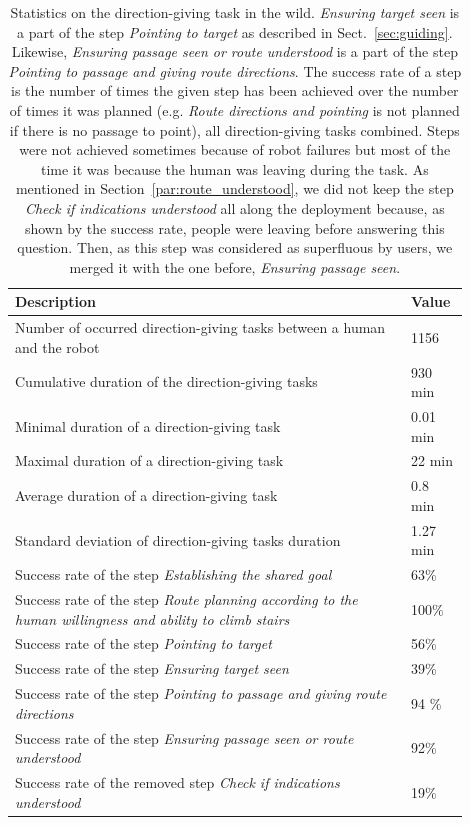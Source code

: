 \documentclass[a4paper,11pt,twoside]{StyleThese}
\begin{document}
\begin{table}[htp]
	\centering
	\begin{tabular}{p{0.8\linewidth}|p{0.1\linewidth}}
		\hline
		Description & Value \\ 
		\hline
		Number of occurred direction-giving tasks between a human and the robot &  1156 \\ 
		Cumulative duration of the direction-giving tasks & 930 min\\ 
		Minimal duration of a direction-giving task & 0.01 min \\ 
		Maximal duration of a direction-giving task & 22 min \\
		Average duration of a direction-giving task & 0.8 min \\
		Standard deviation of direction-giving tasks duration & 1.27 min \\
		Success rate of the step \textit{Establishing the shared goal} & 63\% \\
		Success rate of the step \textit{Route planning according to the human willingness and ability to climb stairs} & 100\% \\
		Success rate of the step \textit{Pointing to target} & 56\% \\
		Success rate of the step \textit{Ensuring target seen} & 39\% \\
		Success rate of the step \textit{Pointing to passage and giving route directions} & 94 \% \\
		Success rate of the step \textit{Ensuring passage seen or route understood} & 92\% \\
		Success rate of the removed step \textit{Check if indications understood} & 19\% \\
		\hline
	\end{tabular}
	\caption{Statistics on the direction-giving task in the wild. \textit{Ensuring target seen} is a part of the step \textit{Pointing to target} as described in Sect.~\ref{sec:guiding}. Likewise,  \textit{Ensuring passage seen or route understood} is a part of the step \textit{Pointing to passage and giving route directions}. The success rate of a step is the number of times the given step has been achieved over the number of times it was planned (e.g. \textit{Route directions and pointing} is not planned if there is no passage to point), all direction-giving tasks combined. Steps were not achieved sometimes because of robot failures but most of the time it was because the human was leaving during the task. As mentioned in Section~\ref{par:route_understood}, we did not keep the step \textit{Check if indications understood} all along the deployment because, as shown by the success rate, people were leaving before answering this question. Then, as this step was considered as superfluous by users, we merged it with the one before, \textit{Ensuring passage seen}.}
	\label{tab:stats_tasks}
\end{table}
\end{document}
